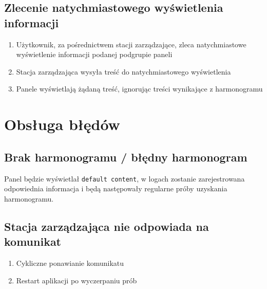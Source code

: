 \documentclass[12pt, a4paper]{article}
\providecommand{\tightlist}{%
  \setlength{\itemsep}{0pt}\setlength{\parskip}{0pt}}
\begin{document}
\hypertarget{zlecenie-natychmiastowego-wyux15bwietlenia-informacji}{%
\subsection{Zlecenie natychmiastowego wyświetlenia informacji}\label{zlecenie-natychmiastowego-wyux15bwietlenia-informacji}}

\begin{enumerate}
\def\labelenumi{\arabic{enumi}.}
\tightlist
\item
  Użytkownik, za pośrednictwem stacji zarządzające, zleca natychmiastowe
  wyświetlenie informacji podanej podgrupie paneli
\item
  Stacja zarządzająca wysyła treść do natychmiastowego wyświetlenia
\item
  Panele wyświetlają żądaną treść, ignorując treści wynikające z
  harmonogramu
\end{enumerate}

\hypertarget{obsux142uga-bux142ux119duxf3w}{%
\section{Obsługa błędów}\label{obsux142uga-bux142ux119duxf3w}}

\hypertarget{brak-harmonogramu-bux142ux119dny-harmonogram}{%
\subsection{Brak harmonogramu / błędny harmonogram}\label{brak-harmonogramu-bux142ux119dny-harmonogram}}

Panel będzie wyświetlał \texttt{default\ content}, w logach zostanie
zarejestrowana odpowiednia informacja i będą następowały regularne próby
uzyskania harmonogramu.

\hypertarget{stacja-zarzux105dzajux105ca-nie-odpowiada-na-komunikat}{%
\subsection{Stacja zarządzająca nie odpowiada na komunikat}\label{stacja-zarzux105dzajux105ca-nie-odpowiada-na-komunikat}}

\begin{enumerate}
\def\labelenumi{\arabic{enumi}.}
\tightlist
\item
  Cykliczne ponawianie komunikatu
\item
  Restart aplikacji po wyczerpaniu prób
\end{enumerate}
\end{document}
